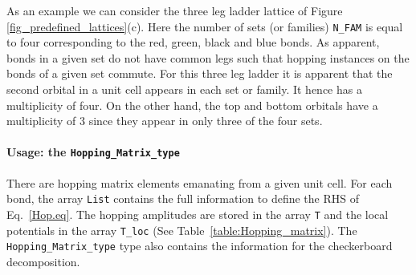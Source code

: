 As an  example we can consider the three leg ladder lattice of Figure \ref{fig_predefined_lattices}(c).   Here the number of sets (or families) \texttt{N\_FAM}  is equal to four  corresponding to the red, green, black and blue  bonds.  As apparent,  bonds in a given set do not have common legs such that hopping instances on the bonds of a given set commute.     For this three leg ladder  it is apparent that the  second orbital in a unit cell appears  in each set or family. It hence has a multiplicity of four. On the other hand, the top and bottom orbitals have a multiplicity of 3 since they appear in only three of the four sets. 



\paragraph*{Usage: the \texttt{Hopping\_Matrix\_type} } %

There are     hopping   matrix  elements  emanating  from  a  given unit  cell. For  each bond,  the array 
\texttt{List}   contains the full  information to define the  RHS of Eq.~\eqref{Hop.eq}.    The hopping amplitudes are  stored in the  array  \texttt{T}  and the local potentials in the  array \texttt{T\_loc}   (See  Table~\ref{table:Hopping_matrix}).    The  \texttt{Hopping\_Matrix\_type}   type    also contains the information for the  checkerboard   decomposition.

